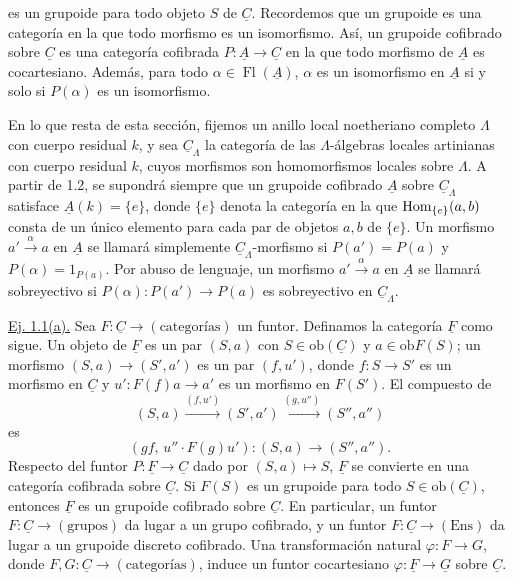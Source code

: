 
es un grupoide para todo objeto $S$ de $\underline C$. Recordemos que un
grupoide es una categoría en la que todo morfismo es un isomorfismo. Así,
un grupoide cofibrado sobre $\underline C$ es una categoría cofibrada
$P:\underline A\longrightarrow\underline C$ en la que todo morfismo de
$\underline A$ es cocartesiano. Además, para todo
$\alpha\in\operatorname{Fl}(\underline A)$, $\alpha$ es un isomorfismo
en $\underline A$ si y solo si $P(\alpha)$ es un isomorfismo.

En lo que resta de esta sección, fijemos un anillo local noetheriano
completo $\Lambda$ con cuerpo residual $k$, y sea $\underline C_\Lambda$
la categoría de las $\Lambda$-álgebras locales artinianas con cuerpo
residual $k$, cuyos morfismos son homomorfismos locales sobre $\Lambda$.
A partir de 1.2, se supondrá siempre que un grupoide cofibrado
$\underline A$ sobre $\underline C_\Lambda$ satisface
$\underline A(k)=\{e\}$, donde $\{e\}$ denota la categoría en la que
$\operatorname{Hom}_{\{e\}}(a,b)$ consta de un único elemento para cada par de objetos
$a,b$ de $\{e\}$. Un morfismo $a'\xrightarrow{\alpha}a$ en
$\underline A$ se llamará simplemente $\underline C_\Lambda$-morfismo si
$P(a')=P(a)$ y $P(\alpha)=1_{P(a)}$. Por abuso de lenguaje, un morfismo
$a'\xrightarrow{\alpha}a$ en $\underline A$ se llamará sobreyectivo si
$P(\alpha):P(a')\longrightarrow P(a)$ es sobreyectivo en
$\underline C_\Lambda$.

\underline{Ej. 1.1(a).} Sea
$F:\underline C\longrightarrow(\text{categorías})$ un funtor.
Definamos la categoría $\underline F$ como sigue. Un objeto de
$\underline F$ es un par $(S,a)$ con
$S\in\mathrm{ob}(\underline C)$ y $a\in\mathrm{ob}F(S)$; un morfismo
$(S,a)\longrightarrow(S',a')$ es un par $(f,u')$, donde
$f:S\longrightarrow S'$ es un morfismo en $\underline C$ y
$u':F(f)a\longrightarrow a'$ es un morfismo en $F(S')$. El compuesto de
\[
 (S,a)\xrightarrow{(f,u')}(S',a')
 \xrightarrow{(g,u'')}(S'',a'')
\]
es
\[
 (gf,\,u''\mathbin{\cdot}F(g)u'):(S,a)\longrightarrow(S'',a'').
\]
Respecto del funtor
$P:\underline F\longrightarrow\underline C$ dado por
$(S,a)\longmapsto S$, $\underline F$ se convierte en una categoría
cofibrada sobre $\underline C$. Si $F(S)$ es un grupoide para todo
$S\in\mathrm{ob}(\underline C)$, entonces $\underline F$ es un grupoide
cofibrado sobre $\underline C$. En particular, un funtor
$F:\underline C\longrightarrow(\text{grupos})$ da lugar a un grupo
cofibrado, y un funtor $F:\underline C\longrightarrow(\mathrm{Ens})$
da lugar a un grupoide discreto cofibrado. Una transformación natural
$\varphi:F\longrightarrow G$, donde $F,G:\underline C\longrightarrow
(\text{categorías})$, induce un funtor cocartesiano
$\varphi:\underline F\longrightarrow\underline G$ sobre $\underline C$.

